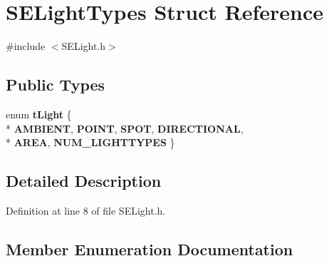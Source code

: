 \section{S\+E\+Light\+Types Struct Reference}
\label{struct_s_e_light_types}


{\ttfamily \#include $<$S\+E\+Light.\+h$>$}

\subsection*{Public Types}
\begin{DoxyCompactItemize}
\item 
enum {\bf t\+Light} \{ \\*
{\bf A\+M\+B\+I\+E\+N\+T}, 
{\bf P\+O\+I\+N\+T}, 
{\bf S\+P\+O\+T}, 
{\bf D\+I\+R\+E\+C\+T\+I\+O\+N\+A\+L}, 
\\*
{\bf A\+R\+E\+A}, 
{\bf N\+U\+M\+\_\+\+L\+I\+G\+H\+T\+T\+Y\+P\+E\+S}
 \}
\end{DoxyCompactItemize}


\subsection{Detailed Description}


Definition at line 8 of file S\+E\+Light.\+h.



\subsection{Member Enumeration Documentation}

